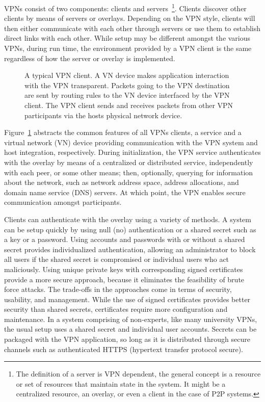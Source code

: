 VPNs consist of two components: clients and servers~\footnote{The definition of
a server is VPN dependent, the general concept is a resource or set of
resources that maintain state in the system.  It might be a centralized
resource, an overlay, or even a client in the case of P2P systems.}.  Clients
discover other clients by means of servers or overlays.  Depending on the VPN
style, clients will then either communicate with each other through servers or
use them to establish direct links with each other.  While setup may be
different amongst the various VPNs, during run time, the environment provided
by a VPN client is the same regardless of how the server or overlay is
implemented.  

\begin{figure}
\centering
{}

\caption[A typical VPN client]{A typical VPN client.  A VN device makes
application interaction with the VPN transparent.  Packets going to the VPN
destination are sent by routing rules to the VN device interfaced by the VPN
client.  The VPN client sends and receives packets from other VPN participants
via the hosts physical network device.}

\label{fig:vpn}
\end{figure}

Figure~\ref{fig:vpn} abstracts the common features of all VPNs clients, a
service and a virtual network (VN) device providing communication with the VPN
system and host integration, respectively.  During initialization, the VPN
service authenticates with the overlay by means of a centralized or distributed
service, independently with each peer, or some other means; then, optionally,
querying for information about the network, such as network address space,
address allocations, and domain name service (DNS) servers.  At which point,
the VPN enables secure communication amongst participants.

Clients can authenticate with the overlay using a variety of methods.  A system
can be setup quickly by using null (no) authentication or a shared secret such
as a key or a password.  Using accounts and passwords with or without a shared
secret provides individualized authentication, allowing an administrator to
block all users if the shared secret is compromised or individual users who act
maliciously.  Using unique private keys with corresponding signed certificates
provide a more secure approach, because it eliminates the feasibility of brute
force attacks.  The trade-offs in the approaches come in terms of security,
usability, and management.  While the use of signed certificates provides
better security than shared secrets, certificates require more configuration
and maintenance.  In a system comprising of non-experts, like many university
VPNs, the usual setup uses a shared secret and individual user accounts.
Secrets can be packaged with the VPN application, so long as it is distributed
through secure channels such as authenticated HTTPS (hypertext transfer
protocol secure).

